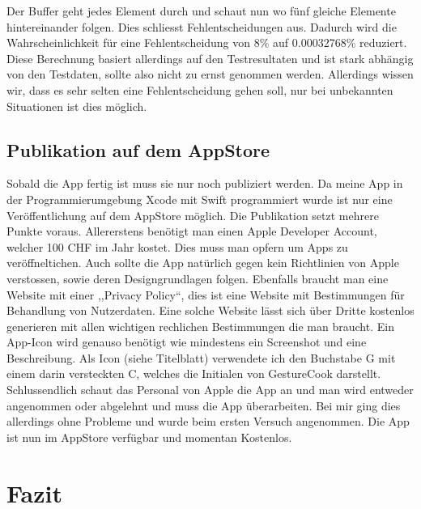 \documentclass[12pt]{article}
\begin{document}
Der Buffer geht jedes Element durch und schaut nun wo fünf gleiche Elemente hintereinander folgen. Dies schliesst Fehlentscheidungen aus. Dadurch wird die Wahrscheinlichkeit für eine Fehlentscheidung von 8\%  auf 0.00032768\% reduziert. Diese Berechnung basiert allerdings auf den Testresultaten und ist stark abhängig von den Testdaten, sollte also nicht zu ernst genommen werden. Allerdings wissen wir, dass es sehr selten eine Fehlentscheidung gehen soll, nur bei unbekannten Situationen ist dies möglich.

\subsection{Publikation auf dem AppStore}
Sobald die App fertig ist muss sie nur noch publiziert werden. Da meine App in der Programmierumgebung Xcode mit Swift programmiert wurde ist nur eine Veröffentlichung auf dem AppStore möglich. Die Publikation setzt mehrere Punkte voraus. Allererstens benötigt man einen Apple Developer Account, welcher 100 CHF im Jahr kostet. Dies muss man opfern um Apps zu veröffneltichen. Auch sollte die App natürlich gegen kein Richtlinien von Apple verstossen, sowie deren Designgrundlagen folgen. Ebenfalls braucht man eine Website mit einer ,,Privacy Policy``, dies ist eine Website mit Bestimmungen für Behandlung von Nutzerdaten. Eine solche Website lässt sich über Dritte kostenlos generieren mit allen wichtigen rechlichen Bestimmungen die man braucht. Ein App-Icon wird genauso benötigt wie mindestens ein Screenshot und eine Beschreibung. Als Icon (siehe Titelblatt) verwendete ich den Buchstabe G mit einem darin versteckten C, welches die Initialen von GestureCook darstellt. Schlussendlich schaut das Personal von Apple die App an und man wird entweder angenommen oder abgelehnt und muss die App überarbeiten. Bei mir ging dies allerdings ohne Probleme und wurde beim ersten Versuch angenommen. Die App ist nun im AppStore verfügbar und momentan Kostenlos.
\section{Fazit}


\renewcommand\refname{Bibliografie}
\newpage

\end{document}
